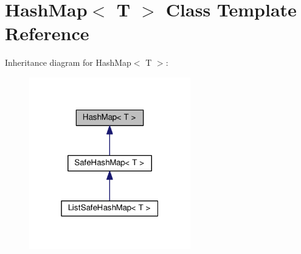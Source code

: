 \hypertarget{classHashMap}{}\section{Hash\+Map$<$ T $>$ Class Template Reference}
\label{classHashMap}


Inheritance diagram for Hash\+Map$<$ T $>$\+:\nopagebreak
\begin{figure}[H]
\begin{center}
\leavevmode
\includegraphics[width=199pt]{classHashMap__inherit__graph}
\end{center}
\end{figure}

